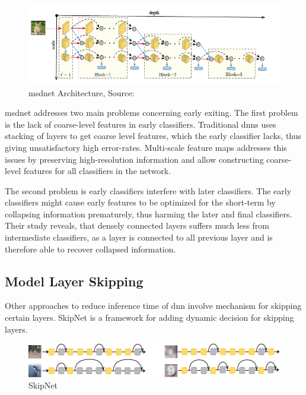 \begin{figure}
	\centering
	\includegraphics[width=\linewidth]{figures/models/msdnet}
	\caption[\gls{msdnet} Architecture]{\gls{msdnet} Architecture, Source:  \cite{huang_multi-scale_2017}}
	\label{fig:msdnet}
\end{figure}

\gls{msdnet} addresses two main problems concerning early exiting. The first problem is the lack of coarse-level features in early classifiers. Traditional \gls{dnn}s uses stacking of layers to get coarse level features, which the early classifier lacks, thus giving unsatisfactory high error-rates. Multi-scale feature maps addresses this issues by preserving high-resolution information and allow constructing coarse-level features for all classifiers in the network.

The second problem is early classifiers interfere with later classifiers. The early classifiers might cause early features to be optimized for the short-term by collapsing information prematurely, thus harming the later and final classifiers. Their study reveals, that densely connected layers suffers much less from intermediate classifiers, as a layer is connected to all previous layer and is therefore able to recover collapsed information.

\subsection{Model Layer Skipping}

Other approaches to reduce inference time of \gls{dnn} involve mechanism for skipping certain layers. SkipNet \cite{wang_skipnet:_2017} is a framework for adding dynamic decision for skipping layers. 

\begin{figure}
	\centering
	\includegraphics[width=\linewidth]{figures/models/skipnet}
	\caption[SkipNet]{SkipNet}
\end{figure}

